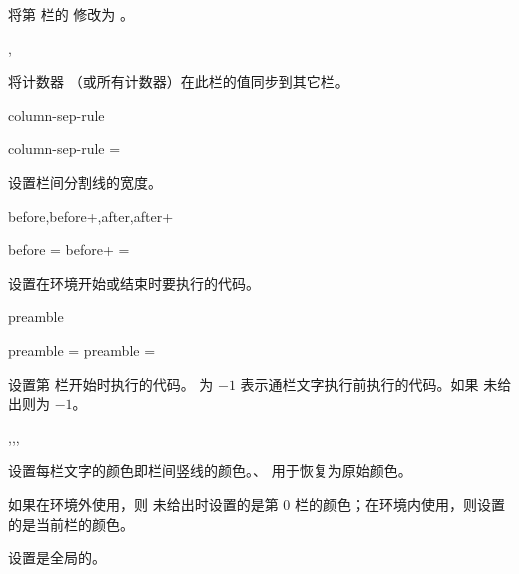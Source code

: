 \documentclass{cusdoc}
\begin{document}
\begin{function}[module=paracol]{}
  \begin{syntax}
    \V{} {}  
  \end{syntax}
  将第  栏的  修改为 。
\end{function}

\begin{function}[module=paracol]{\synccounter,\syncallcounter}
  \begin{syntax}
    \V\synccounter {}
    \V\syncallcounter 
  \end{syntax}
  将计数器  （或所有计数器）在此栏的值同步到其它栏。
\end{function}

\begin{keyval}[path=paracol]{column-sep-rule}
  \begin{syntax}
    column-sep-rule = 
  \end{syntax}
  设置栏间分割线的宽度。
\end{keyval}

\begin{keyval}[path=paracol]{before,before+,after,after+}
  \begin{syntax}
    before  = 
    before+ = 
  \end{syntax}
  设置在环境开始或结束时要执行的代码。
\end{keyval}

\begin{keyval}[path=paracol]{preamble}
  \begin{syntax}
    preamble       \;= 
    preamble  = 
  \end{syntax}
设置第  栏开始时执行的代码。 为 $-1$ 表示通栏文字执行前执行的代码。如果  未给出则为 $-1$。
\end{keyval}

\begin{function}[module=paracol]{\columncolor,\normalcolumncolor,\colseprulecolor,\normalcolseprulecolor}
  \begin{syntax}
    \V\columncolor {}  
    \V\normalcolumncolor {}
    \V\colseprulecolor {}  
    \V\normalcolseprulecolor {}
  \end{syntax}
  设置每栏文字的颜色即栏间竖线的颜色。、 用于恢复为原始颜色。

  如果在环境外使用，则  未给出时设置的是第 0 栏的颜色；在环境内使用，则设置的是当前栏的颜色。

  设置是全局的。
\end{function}
\end{document}
